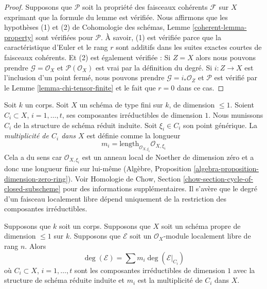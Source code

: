 \begin{proof}
Supposons que $\mathcal{P}$ soit la propriété des faisceaux
cohérents $\mathcal{F}$ sur $X$ exprimant que la formule du lemme
est vérifiée. Nous affirmons que les hypothèses (1) et (2) de
Cohomologie des schémas, Lemme \ref{coherent-lemma-property} sont
vérifiées pour $\mathcal{P}$. À savoir, (1) est vérifiée parce que la
caractéristique d'Euler et le rang $r$ sont additifs dans les suites
exactes courtes de faisceaux cohérents. Et (2) est également vérifiée
: Si $Z = X$ alors nous pouvons prendre $\mathcal{G} = \mathcal{O}_X$
et $\mathcal{P}(\mathcal{O}_X)$ est vrai par la définition du degré.
Si $i : Z \to X$ est l'inclusion d'un point fermé, nous pouvons prendre
$\mathcal{G} = i_*\mathcal{O}_Z$ et $\mathcal{P}$ est vérifié par le
Lemme \ref{lemma-chi-tensor-finite} et le fait que $r = 0$ dans ce cas.
\end{proof}

\noindent
Soit $k$ un corps. Soit $X$ un schéma de type fini sur
$k$, de dimension $\leq 1$. Soient $C_i \subset X$, $i = 1,
\ldots, t$, ses composantes irréductibles de dimension $1$.
Nous munissons $C_i$ de la structure de schéma réduit
induite. Soit $\xi_i \in C_i$ son point générique. La {\it
multiplicité de $C_i$ dans $X$ } est définie comme la longueur
$$
m_i = \text{length}_{\mathcal{O}_{X, \xi_i}} \mathcal{O}_{X, \xi_i}
$$
Cela a du sens car $\mathcal{O}_{X, \xi_i}$ est un anneau local de
Noether de dimension zéro et a donc une longueur finie sur lui-même
(Algèbre, Proposition \ref{algebra-proposition-dimension-zero-ring}). Voir
Homologie de Chow, Section \ref{chow-section-cycle-of-closed-subscheme} pour
des informations supplémentaires. Il s'avère que le degré d'un faisceau
localement libre dépend uniquement de la restriction des composantes irréductibles.

\begin{lemma}
\label{lemma-degree-in-terms-of-components}
Supposons que $k$ soit un corps. Supposons que $X$ soit un schéma
propre de dimension $\leq 1$ sur $k$. Supposons que $\mathcal{E}$
soit un $\mathcal{O}_X$-module localement libre de rang $n$. Alors
$$
\deg(\mathcal{E}) = \sum m_i \deg(\mathcal{E}|_{C_i})
$$
où $C_i \subset X$, $i = 1, \ldots, t$ sont les composantes
irréductibles de dimension $1$ avec la structure de schéma
réduite induite et $m_i$ est la multiplicité de $C_i$ dans $X$.
\end{lemma}

